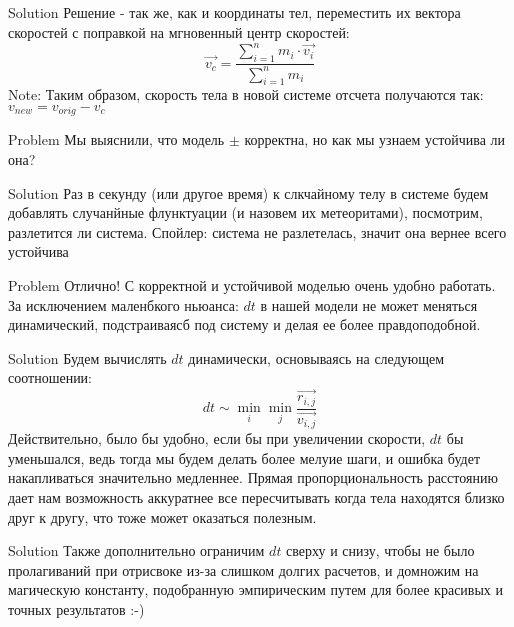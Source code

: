\documentclass{beamer}
\begin{document}
\begin{frame}[fragile]{Solution}
  Решение - так же, как и координаты тел, переместить их вектора скоростей с поправкой на мгновенный центр скоростей:
  \[\overrightarrow{v_c} = \dfrac{\sum_{i = 1}^{n} m_i \cdot \overrightarrow{v_i}}{\sum_{i = 1}^{n} m_i}\]
  Note: Таким образом, скорость тела в новой системе отсчета получаются так: $v_{new} = v_{orig} - v_c$
\end{frame}

\begin{frame}[fragile]{Problem}
  Мы выяснили, что модель $\pm$ корректна, но как мы узнаем устойчива ли она?
\end{frame}

\begin{frame}[fragile]{Solution}
  Раз в секунду (или другое время) к слкчайному телу в системе будем добавлять случанйные флунктуации
  (и назовем их метеоритами), посмотрим, разлетится ли система.\newline
  Спойлер: система не разлетелась, значит она вернее всего устойчива
\end{frame}

\begin{frame}[fragile]{Problem}
  Отлично! С корректной и устойчивой моделью очень удобно работать. За исключением маленбкого ньюанса:
  $dt$ в нашей модели не может меняться динамический, подстраиваясб под систему и делая ее более правдоподобной.
\end{frame}

\begin{frame}[fragile]{Solution}
  Будем вычислять $dt$ динамически, основываясь на следующем соотношении:
  \[dt \sim \min_i \min_j \dfrac{\overrightarrow{r_{i,j}}}{\overrightarrow{v_{i,j}}}\]
  Действительно, было бы удобно, если бы при увеличении скорости, $dt$ бы уменьшался,
  ведь тогда мы будем делать более мелуие шаги, и ошибка будет накапливаться значительно медленнее.\newline
  Прямая пропорциональность расстоянию дает нам возможность аккуратнее все пересчитывать когда тела
  находятся близко друг к другу, что тоже может оказаться полезным.
\end{frame}

\begin{frame}[fragile]{Solution}
  Также дополнительно ограничим $dt$ сверху и снизу, чтобы не было пролагиваний при отрисвоке
  из-за слишком долгих расчетов, и домножим на магическую константу, подобранную эмпирическим
  путем для более красивых и точных результатов :-)
\end{frame}
\end{document}
